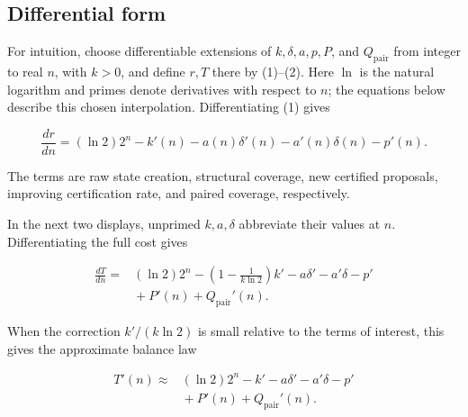 \documentclass[
  10pt,
  english,
]{article}
\begin{document}
\hypertarget{differential-form}{%
\subsection{Differential form}\label{differential-form}}

For intuition, choose differentiable extensions of
\(k,\delta,a,p,P\), and \(Q_{\mathrm{pair}}\) from integer to real
\(n\), with \(k>0\), and define \(r,T\) there by (1)--(2). Here \(\ln\)
is the natural logarithm and primes denote derivatives with respect to
\(n\); the equations below describe
this chosen interpolation. Differentiating (1) gives

\begin{tcolorbox}[compactbox]
\begin{equation}
\frac{dr}{dn} = (\ln 2)2^n - k'(n) - a(n)\delta'(n) - a'(n)\delta(n) - p'(n).
\end{equation}
\end{tcolorbox}

The terms are raw state creation, structural coverage, new certified
proposals, improving certification rate, and paired coverage,
respectively.

In the next two displays, unprimed \(k,a,\delta\) abbreviate their
values at \(n\). Differentiating the full cost gives

\begin{tcolorbox}[compactaccent]
\begin{equation}
\begin{aligned}
\frac{dT}{dn} ={}& (\ln 2)2^n - \left(1 - \frac{1}{k \ln 2}\right)k' - a\delta' - a'\delta - p'\\
&{}+ P'(n) + Q_{\mathrm{pair}}'(n).
\end{aligned}
\end{equation}
\end{tcolorbox}

When the correction \(k'/(k\ln 2)\) is small relative to the terms of
interest, this gives the approximate balance law

\begin{tcolorbox}[compactbox]
\begin{equation}
\begin{aligned}
T'(n) \approx{}& (\ln 2)2^n - k' - a\delta' - a'\delta - p'\\
&{}+ P'(n) + Q_{\mathrm{pair}}'(n).
\end{aligned}
\end{equation}
\end{tcolorbox}
\end{document}
